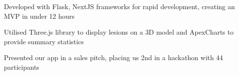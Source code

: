 


{
\item Developed with Flask, NextJS frameworks for rapid development, creating an MVP in under 12 hours


\item Utilised Three.js library to display lesions on a 3D model and ApexCharts to provide summary statistics


\item Presented our app in a sales pitch, placing us 2nd in a hackathon with 44 participants




}